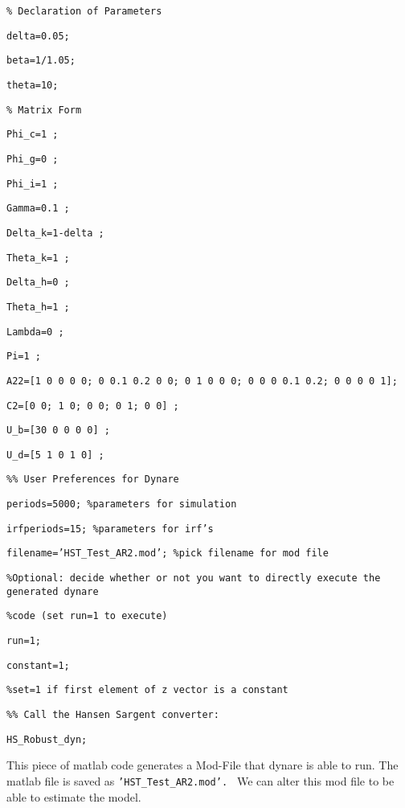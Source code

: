 \documentclass[letter, fleqn, 11pt]{article}
\begin{document}
\texttt{\% Declaration of Parameters}

\texttt{delta=0.05;}

\texttt{beta=1/1.05;}

\texttt{theta=10;}

\bigskip

\texttt{\% Matrix Form}

\texttt{Phi\_c=1 ; }

\texttt{Phi\_g=0 ;}

\texttt{Phi\_i=1 ;}

\texttt{Gamma=0.1 ;}

\texttt{Delta\_k=1-delta ;}

\texttt{Theta\_k=1 ; }

\texttt{Delta\_h=0 ; }

\texttt{Theta\_h=1 ;}

\texttt{Lambda=0 ;}

\texttt{Pi=1 ; }

\texttt{A22=[1 0 0 0 0; 0 0.1 0.2 0 0; 0 1 0 0 0; 0 0 0 0.1 0.2; 0 0 0 0 1];}

\texttt{C2=[0 0; 1 0; 0 0; 0 1; 0 0] ;}

\texttt{U\_b=[30 0 0 0 0] ;}

\texttt{U\_d=[5 1 0 1 0] ;}

\bigskip

\texttt{\%\% User Preferences for Dynare}

\texttt{periods=5000; \%parameters for simulation }

\texttt{irfperiods=15; \%parameters for irf's}

\texttt{filename='\texttt{HST\_Test\_AR2.mod}'; \%pick filename for mod file}

\texttt{\%Optional: decide whether or not you want to directly execute the
generated dynare}

\texttt{\%code (set run=1 to execute)}

\bigskip \texttt{run=1;}

\bigskip \texttt{constant=1;}

\texttt{\%set=1 if first element of z vector is a constant}

\texttt{\%\% Call the Hansen Sargent converter:}

\texttt{HS\_Robust\_dyn;}

\bigskip

This piece of matlab code generates a Mod-File that dynare is able to run. The matlab file is saved as \texttt{'\texttt{HST\_Test\_AR2.mod}'.
} We can alter this mod file to
be able to estimate the model.
\end{document}
